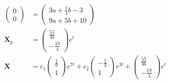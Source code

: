 \documentclass{article}
\begin{document}
\begin{align*}
  \begin{pmatrix}
    0 \\
    0
  \end{pmatrix}   & = \begin{pmatrix}
                        3 a + \frac{1}{3} b - 3 \\
                        9 a + 5 b + 10
                      \end{pmatrix}                                                     \\
  \mathbf{X}_p      & = \begin{pmatrix}
                          \frac{55}{36} \\
                          -\frac{19}{4}
                        \end{pmatrix} e^t                                                         \\
  \mathbf{X}        & = c_1 \begin{pmatrix}
                              \frac{1}{9} \\
                              1
                            \end{pmatrix} e^{7 t} + c_2 \begin{pmatrix}
                                                          -\frac{1}{3} \\
                                                          1
                                                        \end{pmatrix} e^{3 t} + \begin{pmatrix}
                                                                                  \frac{55}{36} \\
                                                                                  -\frac{19}{4}
                                                                                \end{pmatrix} e^t
\end{align*}

\setcounter{subsubsection}{8}
\subsubsection{}
\end{document}
